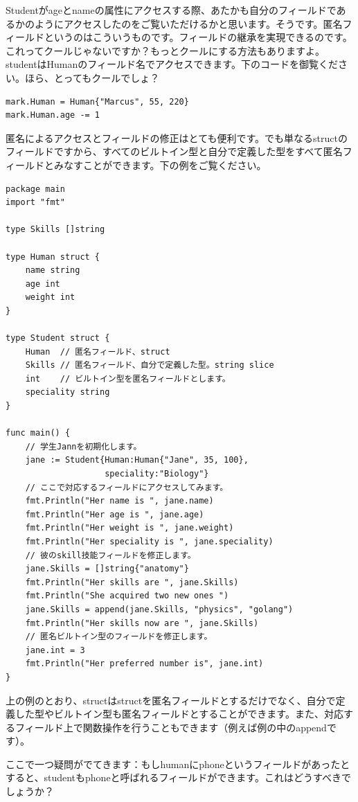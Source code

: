 Studentがageとnameの属性にアクセスする際、あたかも自分のフィールドであるかのようにアクセスしたのをご覧いただけるかと思います。そうです。匿名フィールドというのはこういうものです。フィールドの継承を実現できるのです。これってクールじゃないですか？もっとクールにする方法もありますよ。studentはHumanのフィールド名でアクセスできます。下のコードを御覧ください。ほら、とってもクールでしょ？

\begin{lstlisting}[numbers=none]
mark.Human = Human{"Marcus", 55, 220}
mark.Human.age -= 1
\end{lstlisting}

匿名によるアクセスとフィールドの修正はとても便利です。でも単なるstructのフィールドですから、すべてのビルトイン型と自分で定義した型をすべて匿名フィールドとみなすことができます。下の例をご覧ください。

\begin{lstlisting}[numbers=none]
package main
import "fmt"

type Skills []string

type Human struct {
    name string
    age int
    weight int
}

type Student struct {
    Human  // 匿名フィールド、struct
    Skills // 匿名フィールド、自分で定義した型。string slice
    int    // ビルトイン型を匿名フィールドとします。
    speciality string
}

func main() {
    // 学生Jannを初期化します。
    jane := Student{Human:Human{"Jane", 35, 100},
                    speciality:"Biology"}
    // ここで対応するフィールドにアクセスしてみます。
    fmt.Println("Her name is ", jane.name)
    fmt.Println("Her age is ", jane.age)
    fmt.Println("Her weight is ", jane.weight)
    fmt.Println("Her speciality is ", jane.speciality)
    // 彼のskill技能フィールドを修正します。
    jane.Skills = []string{"anatomy"}
    fmt.Println("Her skills are ", jane.Skills)
    fmt.Println("She acquired two new ones ")
    jane.Skills = append(jane.Skills, "physics", "golang")
    fmt.Println("Her skills now are ", jane.Skills)
    // 匿名ビルトイン型のフィールドを修正します。
    jane.int = 3
    fmt.Println("Her preferred number is", jane.int)
}
\end{lstlisting}

上の例のとおり、structはstructを匿名フィールドとするだけでなく、自分で定義した型やビルトイン型も匿名フィールドとすることができます。また、対応するフィールド上で関数操作を行うこともできます（例えば例の中のappendです）。

ここで一つ疑問がでてきます：もしhumanにphoneというフィールドがあったとすると、studentもphoneと呼ばれるフィールドができます。これはどうすべきでしょうか？

